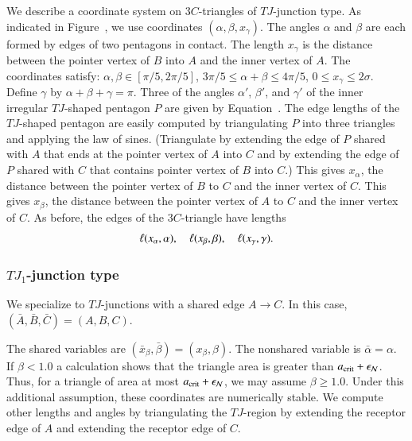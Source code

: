 We describe a coordinate system on $3C$-triangles of $TJ$-junction
type.  As indicated in Figure~, we use coordinates
$(\alpha,\beta,x_\gamma)$.  The angles $\alpha$ and $\beta$ are each
formed by edges of two pentagons in contact.  The length $x_\gamma$ is
the distance between the pointer vertex of $B$ into $A$ and the inner
vertex of $A$.  The coordinates satisfy:
$\alpha,\beta\in[\pi/5,2\pi/5]$, $3\pi/5\le \alpha+\beta\le 4\pi/5$,
$0\le x_\gamma\le 2\sigma$.  Define $\gamma$ by
$\alpha+\beta+\gamma=\pi$.  Three of the angles $\alpha'$, $\beta'$,
and $\gamma'$ of the inner irregular $TJ$-shaped pentagon $P$ are
given by Equation~.  The edge lengths of the $TJ$-shaped
pentagon are easily computed by triangulating $P$ into three triangles
and applying the law of sines.  (Triangulate by extending the edge of
$P$ shared with $A$ that ends at the pointer vertex of $A$ into $C$
and by extending the edge of $P$ shared with $C$ that contains pointer
vertex of $B$ into $C$.)  This gives $x_\alpha$, the distance between
the pointer vertex of $B$ to $C$ and the inner vertex of $C$.  This
gives $x_\beta$, the distance between the pointer vertex of $A$ to $C$
and the inner vertex of $C$.  As before, the edges of the
$3C$-triangle have lengths
\[
\ell(x_\alpha,\alpha),\quad \ell(x_\beta,\beta),\quad \ell(x_\gamma,\gamma).
\]


\subsubsection{$TJ_1$-junction type}

We specialize to $TJ$-junctions with a shared edge $A\to C$.  In this
case, $(\bar A,\bar B,\bar C)=(A,B,C)$.

The shared variables are $(\bar x_\beta,\bar\beta)=(x_\beta,\beta)$.
The nonshared variable is $\bar\alpha=\alpha$.  If $\beta < 1.0$ a
calculation %
shows that the triangle area is greater than $a_\text{crit}+\epsilon_{\mathcal N}$.
Thus, for a triangle of area at most $a_\text{crit}+\epsilon_{\mathcal N}$, we may assume $\beta\ge1.0$.
Under this additional
assumption, these coordinates are numerically stable.
We compute other lengths and angles by triangulating the $TJ$-region
by extending the receptor edge of $A$ and extending the receptor edge
of $C$.

